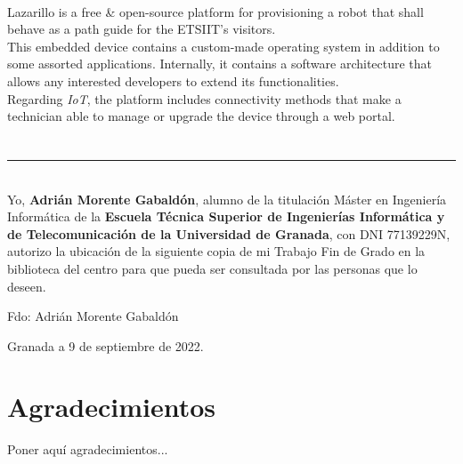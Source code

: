 \vspace{0.7cm}
\\

Lazarillo is a free \& open-source platform for provisioning a robot that shall behave as a path guide for the ETSIIT's visitors.\\

This embedded device contains a custom-made operating system in addition to some assorted applications. Internally, it contains a software architecture that allows any interested developers to extend its functionalities.\\

Regarding \textit{IoT}, the platform includes connectivity methods that make a technician able to manage or upgrade the device through a web portal.

\chapter*{}
\thispagestyle{empty}

\noindent\rule[-1ex]{\textwidth}{2pt}\\[4.5ex]

Yo, \textbf{Adrián Morente Gabaldón}, alumno de la titulación Máster en Ingeniería Informática de la \textbf{Escuela Técnica Superior de Ingenierías Informática y de Telecomunicación de la Universidad de Granada}, con DNI 77139229N, autorizo la ubicación de la siguiente copia de mi Trabajo Fin de Grado en la biblioteca del centro para que pueda ser consultada por las personas que lo deseen.

\vspace{6cm}

\noindent Fdo: Adrián Morente Gabaldón

\vspace{2cm}

\begin{flushright}
Granada a 9 de septiembre de 2022.
\end{flushright}

\chapter*{Agradecimientos}
\thispagestyle{empty}

       \vspace{1cm}


Poner aquí agradecimientos...

